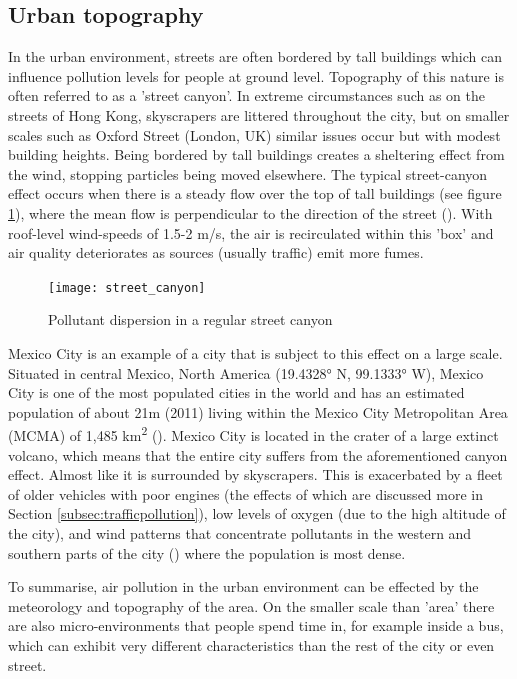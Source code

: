 \subsection{Urban topography}
\label{subsec:urbantopography}

In the urban environment, streets are often bordered by tall buildings which can influence pollution levels for people at ground level. Topography of this nature is often referred to as a 'street canyon'. In extreme circumstances such as on the streets of Hong Kong, skyscrapers are littered throughout the city, but on smaller scales such as Oxford Street (London, UK) similar issues occur but with modest building heights. Being bordered by tall buildings creates a sheltering effect from the wind, stopping particles being moved elsewhere. The typical street-canyon effect occurs when there is a steady flow over the top of tall buildings (see figure \ref{fig:street_canyon}), where the mean flow is perpendicular to the direction of the street (\cite{Britter2003}). With roof-level wind-speeds of 1.5-2 m/s, the air is recirculated within this 'box' and air quality deteriorates as sources (usually traffic) emit more fumes.

\begin{figure}[H]
\centering
\texttt{[image: street\_canyon]}
\caption{Pollutant dispersion in a regular street canyon}
\label{fig:street_canyon}
\end{figure}

Mexico City is an example of a city that is subject to this effect on a large scale. Situated in central Mexico, North America (19.4328° N, 99.1333° W), Mexico City is one of the most populated cities in the world and has an estimated population of about 21m (2011) living within the Mexico City Metropolitan Area (MCMA) of 1,485 km\textsuperscript{2} (\cite{TheUnitedNationsStatisticsDivision2013}). Mexico City is located in the crater of a large extinct volcano, which means that the entire city suffers from the aforementioned canyon effect. Almost like it is surrounded by skyscrapers. This is exacerbated by a fleet of older vehicles with poor engines (the effects of which are discussed more in Section \ref{subsec:trafficpollution}), low levels of oxygen (due to the high altitude of the city), and wind patterns that concentrate pollutants in the western and southern parts of the city (\cite{Garza1996}) where the population is most dense.

To summarise, air pollution in the urban environment can be effected by the meteorology and topography of the area. On the smaller scale than 'area' there are also micro-environments that people spend time in, for example inside a bus, which can exhibit very different characteristics than the rest of the city or even street.

